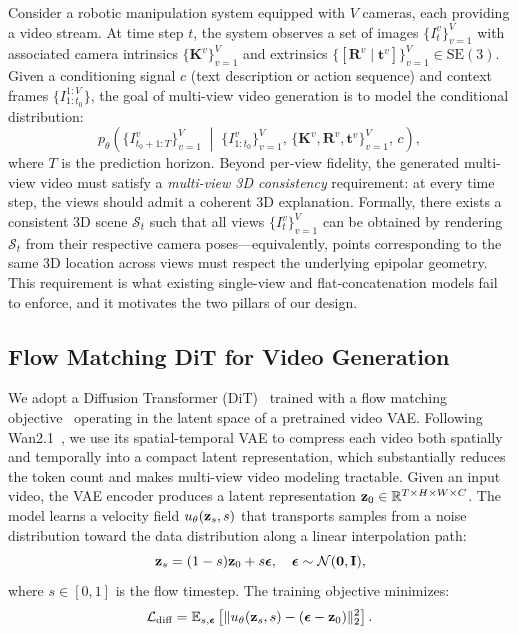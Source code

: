 Consider a robotic manipulation system equipped with $V$ cameras, each providing a video stream. At time step $t$, the system observes a set of images $\{I_t^v\}_{v=1}^{V}$ with associated camera intrinsics $\{\mathbf{K}^v\}_{v=1}^{V}$ and extrinsics $\{[\mathbf{R}^v \mid \mathbf{t}^v]\}_{v=1}^{V} \in \mathrm{SE}(3)$. Given a conditioning signal $c$ (text description or action sequence) and context frames $\{I_{1:t_0}^{1:V}\}$, the goal of multi-view video generation is to model the conditional distribution:
\begin{equation}
\label{eq:mv-gen}
p_\theta\!\left(\{I_{t_0+1:T}^{v}\}_{v=1}^{V} \;\middle|\; \{I_{1:t_0}^{v}\}_{v=1}^{V},\, \{\mathbf{K}^v, \mathbf{R}^v, \mathbf{t}^v\}_{v=1}^{V},\, c\right),
\end{equation}
where $T$ is the prediction horizon. Beyond per-view fidelity, the generated multi-view video must satisfy a \emph{multi-view 3D consistency} requirement: at every time step, the views should admit a coherent 3D explanation. Formally, there exists a consistent 3D scene $\mathcal{S}_t$ such that all views $\{I_t^v\}_{v=1}^V$ can be obtained by rendering $\mathcal{S}_t$ from their respective camera poses---equivalently, points corresponding to the same 3D location across views must respect the underlying epipolar geometry. This requirement is what existing single-view and flat-concatenation models fail to enforce, and it motivates the two pillars of our design.

\subsection{Flow Matching DiT for Video Generation}

We adopt a Diffusion Transformer (DiT)~\cite{peebles2023dit} trained with a flow matching objective~\cite{lipman2023flow,esser2024sd3} operating in the latent space of a pretrained video VAE. Following Wan2.1~\cite{wan2025wan}, we use its spatial-temporal VAE to compress each video both spatially and temporally into a compact latent representation, which substantially reduces the token count and makes multi-view video modeling tractable. Given an input video, the VAE encoder produces a latent representation $\mathbf{z}_0 \in \mathbb{R}^{T \times H \times W \times C}$. The model learns a velocity field $u_\theta(\mathbf{z}_s, s)$ that transports samples from a noise distribution toward the data distribution along a linear interpolation path:
\begin{equation}
\label{eq:flow-matching}
\mathbf{z}_s = (1 - s) \mathbf{z}_0 + s \boldsymbol{\epsilon}, \quad \boldsymbol{\epsilon} \sim \mathcal{N}(\mathbf{0}, \mathbf{I}),
\end{equation}
where $s \in [0, 1]$ is the flow timestep. The training objective minimizes:
\begin{equation}
\label{eq:flow-loss}
\mathcal{L}_{\text{diff}} = \mathbb{E}_{s, \boldsymbol{\epsilon}}\left[\|u_\theta(\mathbf{z}_s, s) - (\boldsymbol{\epsilon} - \mathbf{z}_0)\|_2^2\right].
\end{equation}

